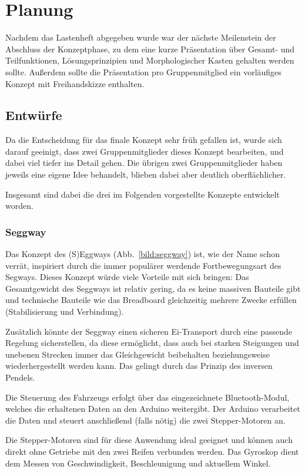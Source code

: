 \chapter{Planung}
Nachdem das Lastenheft abgegeben wurde war der nächste Meilenstein der Abschluss der Konzeptphase, zu dem eine kurze Präsentation über Gesamt- und Teilfunktionen, Lösungsprinzipien und Morphologischer Kasten gehalten werden sollte. Außerdem sollte die Präsentation pro Gruppenmitglied ein vorläufiges Konzept mit Freihandskizze enthalten. 

\section{Entwürfe}
Da die Entscheidung für das finale Konzept sehr früh gefallen ist, wurde sich darauf geeinigt, dass zwei Gruppenmitglieder dieses Konzept bearbeiten, und dabei viel tiefer ins Detail gehen. 
Die übrigen zwei Gruppenmitglieder haben jeweils eine eigene Idee behandelt, blieben dabei aber deutlich oberflächlicher. 

Insgesamt sind dabei die drei im Folgenden vorgestellte Konzepte entwickelt worden.

\subsection{Seggway}
Das Konzept des (S)Eggways (Abb.~\ref{bild:seggway}) ist, wie der Name schon verrät, inspiriert durch die immer populärer werdende Fortbewegungsart des Segways. 
Dieses Konzept würde viele Vorteile mit sich bringen: Das Gesamtgewicht des Seggways ist relativ gering, da es keine massiven Bauteile gibt und technische Bauteile wie das Breadboard gleichzeitig mehrere Zwecke erfüllen (Stabilisierung und Verbindung). 

Zusätzlich könnte der Seggway einen sicheren Ei-Transport durch eine passende Regelung sicherstellen, da diese ermöglicht, dass auch bei starken Steigungen und unebenen Strecken immer das Gleichgewicht beibehalten beziehungsweise wiederhergestellt werden kann. 
Das gelingt durch das Prinzip des inversen Pendels. 

Die Steuerung des Fahrzeugs erfolgt über das eingezeichnete Bluetooth-Modul, welches die erhaltenen Daten an den Arduino weitergibt. 
Der Arduino verarbeitet die Daten und steuert anschließend (falls nötig) die zwei Stepper-Motoren an. 

Die Stepper-Motoren sind für diese Anwendung ideal geeignet und können auch direkt ohne Getriebe mit den zwei Reifen verbunden werden. 
Das Gyroskop dient dem Messen von Geschwindigkeit, Beschleunigung und aktuellem Winkel. 

